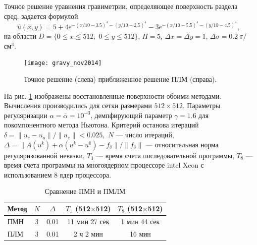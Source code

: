  Точное решение уравнения гравиметрии, определяющее поверхность раздела сред, задается формулой
 $$\hat{u}(x,y)=5+4e^{-(x/10-3.5)^4-(y/10-2.5)^4}-3e^{-(x/10-5.5)^4-(y/10-4.5)^4},$$
 на области $D=\{0\le x\le 512, \,\,0\le y\le 512\}$,  $H=5$, $\Delta x=\Delta y=1$, $\Delta\sigma=0.2$ г/см$^3$.
 \begin{figure}
 	\centering
 	\texttt{[image: gravy\_nov2014]}
 	\caption{Точное решение (слева) приближенное решение ПЛМ (справа).}
 	\label{fig:gravy_nov2014}
 \end{figure}
 На рис. \ref{fig:gravy_nov2014} изображены восстановленные поверхности обоими методами. Вычисления производились для сетки размерами $512\times 512$. Параметры регуляризации $\alpha=\bar{\alpha}=10^{-3}$, демпфирующий параметр $\gamma=1.6$ для покомпонентного метода Ньютона. Критерий останова итераций $\delta=\|u_e-u_a\|/\|u_e\|<0.025,$ $N$ --- число итераций, 
 $\Delta=\|A(u^k)+\alpha(u^k-u^0)-f_\delta\|/\|f_\delta\|$ --- относительная норма регуляризованной невязки, $T_1$ --- время счета последовательной программы, $T_8$ --- время счета программы на многоядерном процессоре intel Xeon с использованием 8 ядер процессора.
 \begin{table}[]
 	\centering
 	\caption{Сравнение ПМН и ПМЛМ}
 	\label{table3.7}
 	\begin{tabular}{|p{}|c|c|c|c|}
 		\hline
 		\multicolumn{1}{|c|}{\textbf{Метод}}            & \textbf{$N$} & \textbf{$\Delta$} & \textbf{$T_1$ (512$\times$512)} & \textbf{$T_8$ (512$\times$512)} \\ \hline
 		ПМН               & 3         & 0.01             & 11 мин 27 сек   & 1 мин 44 сек    \\ \hline
 		ПЛМ & 3   &     0.01              & 2 ч 2 мин       & 16 мин          \\ \hline
 	\end{tabular}
 \end{table}
 
